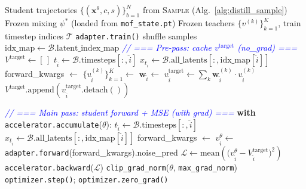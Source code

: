 \documentclass[11pt,a4paper]{article}
\newcommand{\loss}{\mathcal{L}}
\theoremstyle{definition}
\begin{document}
\begin{algorithm}[H]
\caption{MoF On-Policy Distillation (\texttt{trainers/mof/distill.py:optimize})}
\label{alg:distill}
\begin{algorithmic}[1]
\Require Student trajectories $\{(\mathbf{x}^\theta, c, s)\}_{b=1}^N$ from \textsc{Sample} (Alg.~\ref{alg:distill_sample})
\Require Frozen mixing $\psi^*$ (loaded from \texttt{mof\_state.pt})
\Require Frozen teachers $\{v^{(k)}\}_{k=1}^K$, train timestep indices $\mathcal{T}$
\Statex
\State \texttt{adapter.train()}
  \State shuffle samples
    \State $\text{idx\_map} \gets \mathcal{B}.\text{latent\_index\_map}$
    \Statex \quad\textcolor{blue}{\textit{// === Pre-pass: cache $v^{\text{target}}$ (no\_grad) ===}}
    \State $V^{\text{target}} \gets [\,]$
     
      \State $t_{\hat{i}} \gets \mathcal{B}.\text{timesteps}[:, \hat{i}]$
      \State $x_{t_{\hat{i}}} \gets \mathcal{B}.\text{all\_latents}[:, \text{idx\_map}[\hat{i}]]$
      \State forward\_kwargs $\gets$ 
      \State $\{v^{(k)}_{\hat{i}}\}_{k=1}^K \gets$ 
      \State $\mathbf{w}_{\hat{i}} \gets$ 
      \State $v^{\text{target}}_{\hat{i}} \gets \sum_k \mathbf{w}_{\hat{i}}^{(k)} \cdot v^{(k)}_{\hat{i}}$
      \State $V^{\text{target}}.\text{append}(v^{\text{target}}_{\hat{i}}.\text{detach}())$
    \EndFor

    \Statex \quad\textcolor{blue}{\textit{// === Main pass: student forward + MSE (with grad) ===}}
      \State \textbf{with} \texttt{accelerator.accumulate}($\theta$):
      \State \quad $t_{\hat{i}} \gets \mathcal{B}.\text{timesteps}[:, \hat{i}]$
      \State \quad $x_{t_{\hat{i}}} \gets \mathcal{B}.\text{all\_latents}[:, \text{idx\_map}[\hat{i}]]$
      \State \quad forward\_kwargs $\gets$ 
      \State \quad $v^\theta_{\hat{i}} \gets$ \texttt{adapter.forward}(forward\_kwargs).noise\_pred
      \State \quad $\loss \gets \mathrm{mean}\!\left(\big(v^\theta_{\hat{i}} - V^{\text{target}}_{\hat{i}}\big)^2\right)$
      \State \quad \texttt{accelerator.backward}($\loss$)
        \State \texttt{clip\_grad\_norm}($\theta$, \texttt{max\_grad\_norm})
        \State \texttt{optimizer.step()}; \texttt{optimizer.zero\_grad()}
      \EndIf
    \EndFor
  \EndFor
\EndFor
\end{algorithmic}
\end{algorithm}
\end{document}
